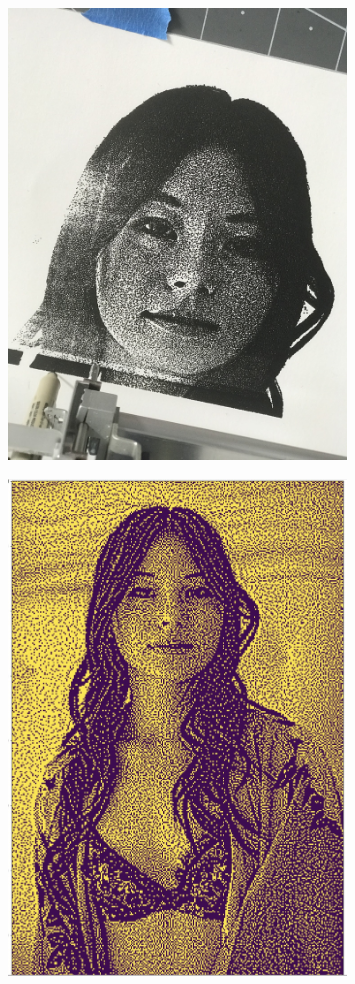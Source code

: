 \documentclass[12pt]{book}
\begin{document}
\begin{figure}
        \centering
        \includegraphics[width=0.8\textwidth]{figures/ofig/marie.jpg}
    \end{figure}

\begin{figure}
        \centering
        \includegraphics[width=0.8\textwidth]{figures/ofig/marie8bit.jpg}
    \end{figure}
\end{document}
